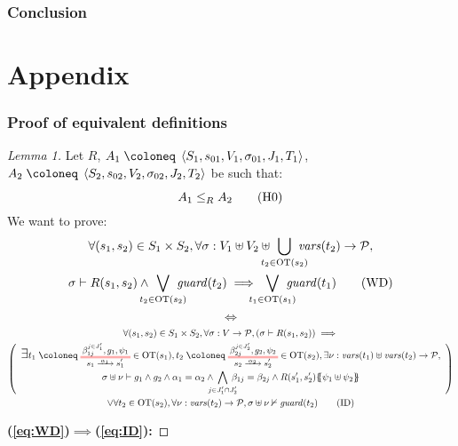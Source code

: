 \documentclass{article}
\begin{document}
\section{Conclusion}

\pagebreak



\pagebreak
\appendix
\part*{Appendix}

\section{Proof of equivalent definitions}\label{apx:lemeqd}
\begin{proof}[Lemma 1]
Let \(R\), \(A_1 \defobject \OA{S_1}{s_{01}}{V_1}{\sigma_{01}}{J_1}{T_1}\), \(A_2 \defobject \OA{S_2}{s_{02}}{V_2}{\sigma_{02}}{J_2}{T_2}\) be such that:
\[ \wrel{A_1}{A_2}{R} \hyp{0} \]
We want to prove:
\begin{multline}
	\forall \mpar{s_1, s_2} \in S_1 \times S_2, \forall \sigma: V_1 \uplus V_2 \uplus \bigcup_\subbox{t_2 \in \fOT{s_2}} \fvars{t_2} \to \values, \\
	\sigma \vdash R\mpar{s_1, s_2} \wedge \bigvee_\subbox{t_2 \in \fOT{s_2}} \fguard{t_2} \implies \bigvee_\subbox{t_1 \in \fOT{s_1}} \fguard{t_1} \tag{WD}\label{eq:WD}
\end{multline}
\[ \iff \]
\begin{multline}
	\forall \mpar{s_1, s_2} \in S_1 \times S_2, \forall \sigma: V \to \values, \mpar{\sigma \vdash R\mpar{s_1, s_2}} \implies \\
	\mpar{\everymath{\displaystyle}\begin{array}{c}
		\bigsymb{\exists} t_1 \defobject \OTx{1}{}{1}{1} \in \fOT{s_1}, t_2 \defobject \OTx{2}{}{2}{2} \in \fOT{s_2}, \exists \nu: \fvars{t_1} \uplus \fvars{t_2} \to \values, \\
		\sigma \uplus \nu \vdash g_1 \wedge g_2 \wedge \alpha_1 = \alpha_2 \wedge \bigwedge_\subbox{j \in J'_1 \cap J'_2} \beta_{1j} = \beta_{2j} \wedge R\mpar{s'_1, s'_2}\psubst{\psi_1 \uplus \psi_2}
	\end{array}} \\
	\vee \forall t_2 \in \fOT{s_2}, \forall \nu: \fvars{t_2} \to \values, \sigma \uplus \nu \nvdash \fguard{t_2} \tag{ID}\label{eq:ID}
\end{multline}
\item[\bf(\ref{eq:WD})\(\implies\)(\ref{eq:ID}):]

\end{proof}
\end{document}
